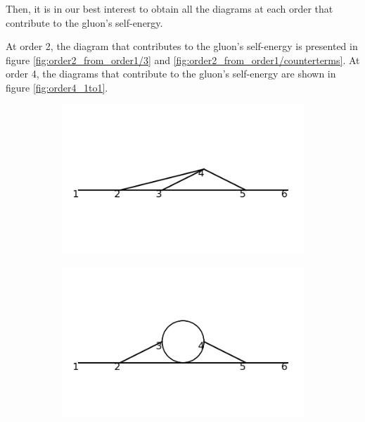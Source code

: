 \documentclass[11pt,a4paper,twoside,pdf]{article}
\numberwithin{equation}{section}
\begin{document}
Then, it is in our best interest to obtain all the diagrams at each order that contribute
to the gluon's self-energy.

At order 2, the diagram that contributes to the gluon's self-energy is presented in figure 
\ref{fig:order2_from_order1/3}  and \ref{fig:order2_from_order1/counterterms}.
At order 4, the diagrams that contribute to the gluon's self-energy are shown in figure
\ref{fig:order4_1to1}.

\begin{figure}[h!]
    \centering
    \begin{subfigure}[t]{0.19\textwidth}
        \centering
        \includegraphics[width=\textwidth]{plots/order4_1to1/1.png}
        \caption{ }
    \end{subfigure}%
    \begin{subfigure}[t]{0.19\textwidth}
        \centering
        \includegraphics[width=\textwidth]{plots/order4_1to1/2.png}
        \caption{ }
    \end{subfigure}

\end{figure}
\end{document}
